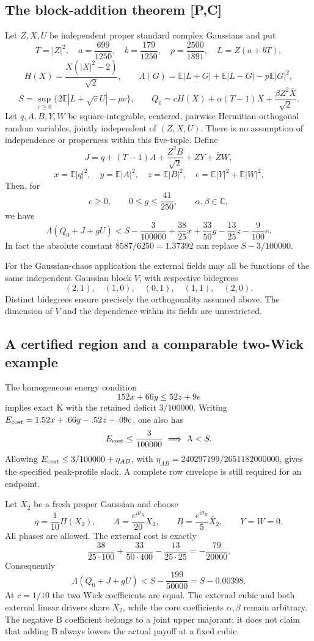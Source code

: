 \subsection{The block-addition theorem [P,C]}
Let \(Z,X,U\) be independent proper standard complex Gaussians and put
\[
T=|Z|^2,\quad a=\frac{699}{1250},\quad b=\frac{179}{1250},
\quad p=\frac{2500}{1891},\quad L=Z(a+bT),
\]
\[
H(X)=\frac{X(|X|^2-2)}{\sqrt2},\qquad
\Lambda(G)=\mathbb E|L+G|+\mathbb E|L-G|-p\mathbb E|G|^2,
\]
\[
S=\sup_{v\ge0}\{2\mathbb E|L+\sqrt vU|-pv\},\qquad
Q_0=cH(X)+\alpha(T-1)X+\frac{\beta Z^2\bar X}{\sqrt2}.
\]
Let \(q,A,B,Y,W\) be square-integrable, centered, pairwise
Hermitian-orthogonal random variables, jointly independent of \((Z,X,U)\).
There is no assumption of independence or properness within this five-tuple.
Define
\[
J=q+(T-1)A+\frac{Z^2B}{\sqrt2}+ZY+\bar ZW,
\]
\[
x=\mathbb E|q|^2,\quad y=\mathbb E|A|^2,\quad
z=\mathbb E|B|^2,\quad e=\mathbb E|Y|^2+\mathbb E|W|^2.
\]
Then, for
\[
c\ge0,\qquad 0\le g\le\frac{41}{250},
\qquad \alpha,\beta\in\mathbb C,
\]
we have
\[
\boxed{\Lambda(Q_0+J+gU)
<S-\frac3{100000}
+\frac{38}{25}x+\frac{33}{50}y-\frac{13}{25}z-\frac9{100}e.}
\tag{B}
\]
In fact the absolute constant \(8587/6250=1.37392\) can replace
\(S-3/100000\).

For the Gaussian-chaos application the external fields may all be functions
of the same independent Gaussian block \(V\), with respective bidegrees
\[
(2,1),\quad(1,0),\quad(0,1),\quad(1,1),\quad(2,0).
\]
Distinct bidegrees ensure precisely the orthogonality assumed above.
The dimension of \(V\) and the dependence within its fields are unrestricted.

\subsection{A certified region and a comparable two-Wick example}
The homogeneous energy condition
\[
\boxed{152x+66y\le52z+9e}
\tag{C}
\]
implies exact K with the retained deficit \(3/100000\).
Writing \(E_{\rm cost}=1.52x+.66y-.52z-.09e\), one also has
\[
E_{\rm cost}\le\frac3{100000}\ \Longrightarrow\ \Lambda<S.
\]
Allowing \(E_{\rm cost}\le3/100000+\eta_{AB}\), with
\(\eta_{AB}=240297199/2651182000000\), gives the specified
peak-profile slack. A complete row envelope is still required for an endpoint.

Let \(X_2\) be a fresh proper Gaussian and choose
\[
q=\frac1{10}H(X_2),\qquad
A=\frac{e^{i\theta_A}}{20}X_2,\qquad
B=\frac{e^{i\theta_B}}5\bar X_2,\qquad Y=W=0.
\]
All phases are allowed. The external cost is exactly
\[
\frac{38}{25\cdot100}+\frac{33}{50\cdot400}
-\frac{13}{25\cdot25}=-\frac{79}{20000}.
\]
Consequently
\[
\Lambda(Q_0+J+gU)<S-\frac{199}{50000}=S-0.00398.
\]
At \(c=1/10\) the two Wick coefficients are equal. The external cubic and
both external linear drivers share \(X_2\), while the core coefficients
\(\alpha,\beta\) remain arbitrary.
The negative B coefficient belongs to a joint upper majorant; it does not
claim that adding B always lowers the actual payoff at a fixed cubic.

